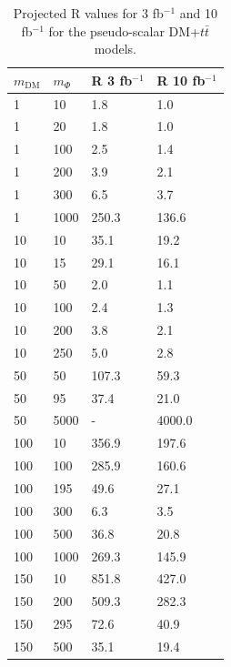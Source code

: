 \begin{table}[h!]
\begin{table}[h!]
  \centering
  \begin{tabular}{llll}
    \hline                      
    $m_\textrm{DM}$ & $m_\Phi$  & R 3 fb$^{-1}$ & R 10 fb$^{-1}$ \\ \hline
    1       & 10      & 1.8     & 1.0 \\ \hline
    1       & 20      & 1.8     & 1.0 \\ \hline
    1       & 100     & 2.5     & 1.4 \\ \hline
    1       & 200     & 3.9     & 2.1 \\ \hline
    1       & 300     & 6.5     & 3.7 \\ \hline
    1       & 1000    & 250.3   & 136.6 \\ \hline
    10      & 10      & 35.1    & 19.2 \\ \hline
    10      & 15      & 29.1    & 16.1 \\ \hline
    10      & 50      & 2.0     & 1.1 \\ \hline
    10      & 100     & 2.4     & 1.3 \\ \hline
    10      & 200     & 3.8     & 2.1 \\ \hline
    10      & 250     & 5.0     & 2.8 \\ \hline
    50      & 50      & 107.3   & 59.3 \\ \hline
    50      & 95      & 37.4    & 21.0 \\ \hline
    50      & 5000    & -       & 4000.0 \\ \hline
    100     & 10      & 356.9   & 197.6 \\ \hline
    100     & 100     & 285.9   & 160.6 \\ \hline
    100     & 195     & 49.6    & 27.1 \\ \hline
    100     & 300     & 6.3     & 3.5 \\ \hline
    100     & 500     & 36.8    & 20.8 \\ \hline
    100     & 1000    & 269.3   & 145.9 \\ \hline
    150     & 10      & 851.8   & 427.0 \\ \hline
    150     & 200     & 509.3   & 282.3 \\ \hline
    150     & 295     & 72.6    & 40.9 \\ \hline
    150     & 500     & 35.1    & 19.4 \\ \hline
  \end{tabular}
  \caption{Projected R values for 3 fb$^{-1}$ and 10 fb$^{-1}$ for the pseudo-scalar DM+$t\bar{t}$ models.
    \label{tab:dmtt_P_R_values}}
\end{table}



\end{table}
